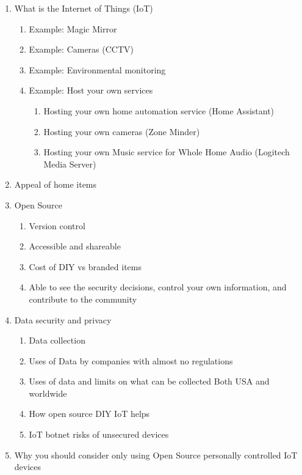 \documentclass[12pt]{article}
\begin{document}
\begin{enumerate}
    \item What is the Internet of Things (IoT)
    \begin{enumerate}
        \item Example: Magic Mirror
        \item Example: Cameras (CCTV)
        \item Example: Environmental monitoring
        \item Example: Host your own services
        \begin{enumerate}
            \item Hosting your own home automation service (Home Assistant)
            \item Hosting your own cameras (Zone Minder)
            \item Hosting your own Music service for Whole Home Audio (Logitech Media Server)
        \end{enumerate}
    \end{enumerate}
    \item Appeal of home items 
    \item Open Source
    \begin{enumerate}
        \item Version control
        \item Accessible and shareable
        \item Cost of DIY vs branded items
        \item Able to see the security decisions, control your own information, and contribute to the community
    \end{enumerate}
    \item Data security and privacy
    \begin{enumerate}
        \item Data collection
        \item Uses of Data by companies with almost no regulations
        \item Uses of data and limits on what can be collected Both USA and worldwide
        \item How open source DIY IoT helps
        \item IoT botnet risks of unsecured devices
    \end{enumerate}
    \item Why you should consider only using Open Source personally controlled IoT devices
\end{enumerate}
\end{document}
